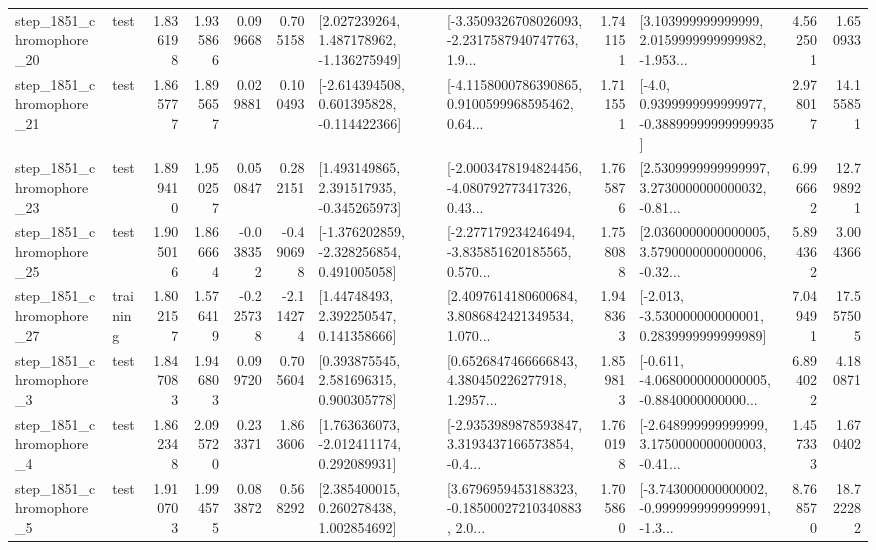\begin{tabular}{llrrrrllrlrr}
 step\_1851\_chromophore\_20 &      test &      1.836198 &    1.935866 &      0.099668 &  0.705158 &    [2.027239264, 1.487178962, -1.136275949] &  [-3.3509326708026093, -2.2317587940747763, 1.9... &       1.741151 &  [3.103999999999999, 2.0159999999999982, -1.953... &            4.562501 &          1.650933 \\
 step\_1851\_chromophore\_21 &      test &      1.865777 &    1.895657 &      0.029881 &  0.100493 &   [-2.614394508, 0.601395828, -0.114422366] &  [-4.1158000786390865, 0.9100599968595462, 0.64... &       1.711551 &   [-4.0, 0.9399999999999977, -0.38899999999999935] &            2.978017 &         14.155851 \\
 step\_1851\_chromophore\_23 &      test &      1.899410 &    1.950257 &      0.050847 &  0.282151 &    [1.493149865, 2.391517935, -0.345265973] &  [-2.0003478194824456, -4.080792773417326, 0.43... &       1.765876 &  [2.5309999999999997, 3.2730000000000032, -0.81... &            6.996662 &         12.798921 \\
 step\_1851\_chromophore\_25 &      test &      1.905016 &    1.866664 &     -0.038352 & -0.490698 &   [-1.376202859, -2.328256854, 0.491005058] &  [-2.277179234246494, -3.835851620185565, 0.570... &       1.758088 &  [2.0360000000000005, 3.5790000000000006, -0.32... &            5.894362 &          3.004366 \\
 step\_1851\_chromophore\_27 &  training &      1.802157 &    1.576419 &     -0.225738 & -2.114274 &      [1.44748493, 2.392250547, 0.141358666] &  [2.4097614180600684, 3.8086842421349534, 1.070... &       1.948363 &   [-2.013, -3.530000000000001, 0.2839999999999989] &            7.049491 &         17.557505 \\
  step\_1851\_chromophore\_3 &      test &      1.847083 &    1.946803 &      0.099720 &  0.705604 &     [0.393875545, 2.581696315, 0.900305778] &  [0.6526847466666843, 4.380450226277918, 1.2957... &       1.859813 &  [-0.611, -4.0680000000000005, -0.8840000000000... &            6.894022 &          4.180871 \\
  step\_1851\_chromophore\_4 &      test &      1.862348 &    2.095720 &      0.233371 &  1.863606 &    [1.763636073, -2.012411174, 0.292089931] &  [-2.9353989878593847, 3.3193437166573854, -0.4... &       1.760198 &  [-2.648999999999999, 3.1750000000000003, -0.41... &            1.457333 &          1.670402 \\
  step\_1851\_chromophore\_5 &      test &      1.910703 &    1.994575 &      0.083872 &  0.568292 &     [2.385400015, 0.260278438, 1.002854692] &  [3.6796959453188323, -0.18500027210340883, 2.0... &       1.705860 &  [-3.743000000000002, -0.9999999999999991, -1.3... &            8.768570 &         18.722282 \\

\end{tabular}
